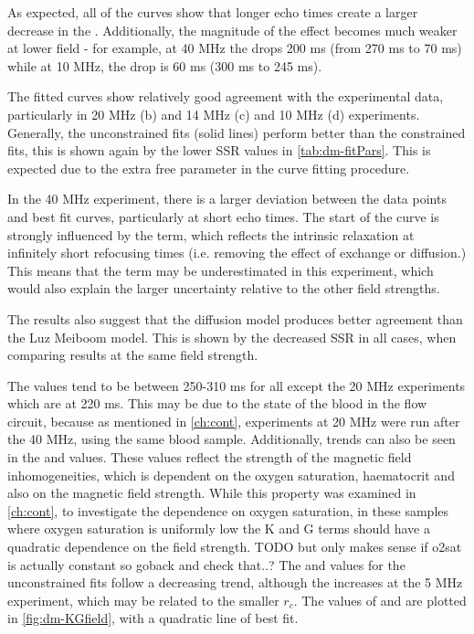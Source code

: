As expected, all of the curves show that longer echo times create a larger decrease in the \Ttwo.
Additionally, the magnitude of the effect becomes much weaker at lower field - for example, at 40 MHz the \Ttwo drops 200 ms (from 270 ms to 70 ms) while at 10 MHz, the \Ttwo drop is 60 ms (300 ms to 245 ms).

The fitted curves show relatively good agreement with the experimental data, particularly in 20 MHz (b) and 14 MHz (c) and 10 MHz (d) experiments.
Generally, the unconstrained fits (solid lines) perform better than the constrained fits, this is shown again by the lower SSR values in \autoref{tab:dm-fitPars}.
This is expected due to the extra free parameter in the curve fitting procedure.

In the 40 MHz experiment, there is a larger deviation between the data points and best fit curves, particularly at short echo times.
The start of the curve is strongly influenced by the \TtwoO term, which reflects the intrinsic relaxation at infinitely short refocusing times (i.e. removing the effect of exchange or diffusion.)
This means that the  \TtwoO term may be underestimated in this experiment, which would also explain the larger uncertainty relative to the other field strengths.

The results also suggest that the diffusion model produces better agreement than the Luz Meiboom model.
This is shown by the decreased SSR in all cases, when comparing results at the same field strength.

The \TtwoO values tend to be between 250-310 ms for all except the 20 MHz experiments which are at 220 ms.
This may be due to the state of the blood in the flow circuit, because as mentioned in \autoref{ch:cont}, experiments at 20 MHz were run after the 40 MHz, using the same blood sample.
Additionally, trends can also be seen in the \Kzero and \Gzero values.
These values reflect the strength of the magnetic field inhomogeneities, which is dependent on the oxygen saturation, haematocrit and also on the magnetic field strength.
While this property was examined in \autoref{ch:cont}, to investigate the dependence on oxygen saturation, in these samples where oxygen saturation is uniformly low the K and G terms should have a quadratic dependence on the field strength. TODO but only makes sense if o2sat is actually constant so goback and check that..?
The \Kzero and \Gzero values for the unconstrained fits follow a decreasing trend, although the \Gzero increases at the 5 MHz experiment, which may be related to the smaller $r_c$.
The values of \Kzero and \Gzero are plotted in \autoref{fig:dm-KGfield}, with a quadratic line of best fit. %

